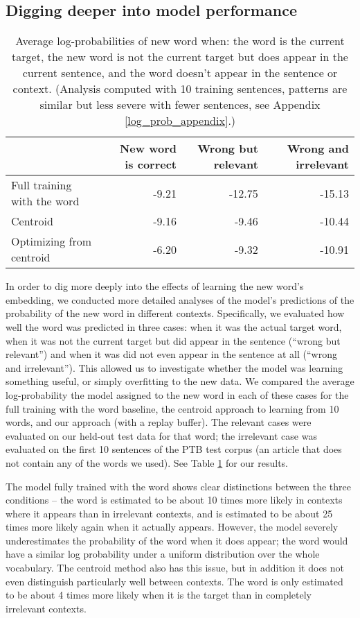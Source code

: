 \documentclass{article}
\begin{document}
\subsection{Digging deeper into model performance} \label{digging_deeper}
\begin{table}[ht]
\centering
\begin{tabular}{|l|rrr|}
  \hline
  & New word is correct & Wrong but relevant & Wrong and irrelevant \\ 
  \hline
  Full training with the word & -9.21 & -12.75 & -15.13 \\ 
  Centroid & -9.16 & -9.46 & -10.44 \\ 
  Optimizing from centroid & -6.20 & -9.32 & -10.91 \\ 
   \hline
\end{tabular}
\caption{Average log-probabilities of new word when: the word is the current target, the new word is not the current target but does appear in the current sentence, and the word doesn't appear in the sentence or context. (Analysis computed with 10 training sentences, patterns are similar but less severe with fewer sentences, see Appendix \ref{log_prob_appendix}.)} \label{word_prob_table} 
\end{table}
In order to dig more deeply into the effects of learning the new word’s embedding, we conducted more detailed analyses of the model’s predictions of the probability of the new word in different contexts. Specifically, we evaluated how well the word was predicted in three cases: when it was the actual target word, when it was not the current target but did appear in the sentence (``wrong but relevant'') and when it was did not even appear in the sentence at all (``wrong and irrelevant''). This allowed us to investigate whether the model was learning something useful, or simply overfitting to the new data. We compared the average log-probability the model assigned to the new word in each of these cases for the full training with the word baseline, the centroid approach to learning from 10 words, and our approach (with a replay buffer). The relevant cases were evaluated on our held-out test data for that word; the irrelevant case was evaluated on the first 10 sentences of the PTB test corpus (an article that does not contain any of the words we used). See Table \ref{word_prob_table} for our results. \par 
The model fully trained with the word shows clear distinctions between the three conditions -- the word is estimated to be about 10 times more likely in contexts where it appears than in irrelevant contexts, and is estimated to be about 25 times more likely again when it actually appears. However, the model severely underestimates the probability of the word when it does appear; the word would have a similar log probability under a uniform distribution over the whole vocabulary. The centroid method also has this issue, but in addition it does not even distinguish particularly well between contexts. The word is only estimated to be about 4 times more likely when it is the target than in completely irrelevant contexts. \par
\end{document}
